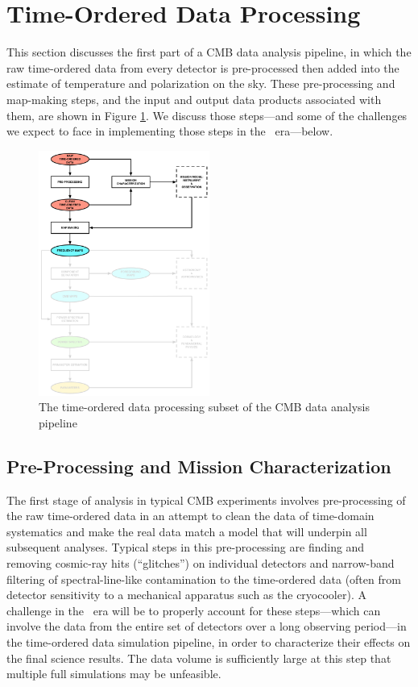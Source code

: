  
\section{Time-Ordered Data Processing}

This section discusses the first part of a CMB data analysis pipeline, in which the raw
time-ordered data from every detector is pre-processed then added into the estimate
of temperature and polarization on the sky. These pre-processing and map-making steps,
and the input and output data products associated with them, are shown in Figure 
\ref{fig_td}. We discuss those steps---and some of the challenges we expect to face in
implementing those steps in the \cmbexp\ era---below.


\begin{figure}[htbp]
\centering
\includegraphics[width=0.5\textwidth]{Analysis/td}
\caption{The time-ordered data processing subset of the CMB data analysis pipeline}
\label{fig_td}
\end{figure}


\subsection{Pre-Processing and Mission Characterization}

The first stage of analysis in typical CMB experiments involves pre-processing of the raw 
time-ordered data in an attempt to clean the data of time-domain systematics and 
make the real data match a model that will underpin all subsequent analyses. Typical 
steps in this pre-processing are finding and removing cosmic-ray hits (``glitches'') on individual detectors
and narrow-band filtering of spectral-line-like contamination to the time-ordered data (often 
from detector sensitivity to a mechanical apparatus such as the cryocooler). 
A challenge in the \cmbexp\ era will be to properly account for these steps---which can involve
the data from the entire set of detectors over a long observing period---in the time-ordered data
simulation pipeline, in order to characterize their effects on the final science results. The data 
volume is sufficiently large at this step that multiple full simulations may be unfeasible.

